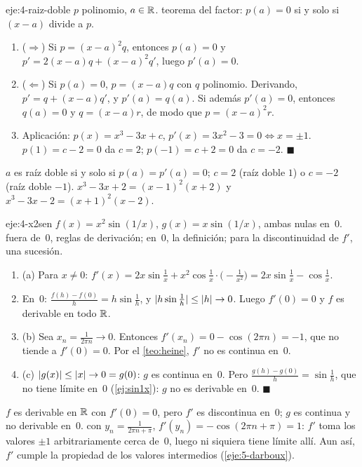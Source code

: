 \begin{solucion}{eje:4-raiz-doble}
\datos $p$ polinomio, $a\in\mathbb{R}$.
\planteamiento teorema del factor: $p(a)=0$ si y solo si $(x-a)$ divide a $p$.
\pasos
\begin{enumerate}[label=\arabic*.]
  \item ($\Rightarrow$) Si $p=(x-a)^{2}q$, entonces $p(a)=0$ y $p'=2(x-a)q+(x-a)^{2}q'$, luego $p'(a)=0$.
  \item ($\Leftarrow$) Si $p(a)=0$, $p=(x-a)q$ con $q$ polinomio. Derivando, $p'=q+(x-a)q'$, y $p'(a)=q(a)$. Si además $p'(a)=0$, entonces $q(a)=0$ y $q=(x-a)r$, de modo que $p=(x-a)^{2}r$.
  \item Aplicación: $p(x)=x^{3}-3x+c$, $p'(x)=3x^{2}-3=0\iff x=\pm1$. $p(1)=c-2=0$ da $c=2$; $p(-1)=c+2=0$ da $c=-2$. \hfill$\blacksquare$
\end{enumerate}
\resultado $a$ es raíz doble si y solo si $p(a)=p'(a)=0$; $c=2$ (raíz doble $1$) o $c=-2$ (raíz doble $-1$).
\comprobacion $x^{3}-3x+2=(x-1)^{2}(x+2)$ y $x^{3}-3x-2=(x+1)^{2}(x-2)$.
\end{solucion}

\begin{solucion}{eje:4-x2sen}
\datos $f(x)=x^{2}\sin(1/x)$, $g(x)=x\sin(1/x)$, ambas nulas en~0.
\planteamiento fuera de~0, reglas de derivación; en~0, la definición; para la discontinuidad de $f'$, una sucesión.
\pasos
\begin{enumerate}[label=\arabic*.]
  \item (a) Para $x\ne0$: $f'(x)=2x\sin\frac1x+x^{2}\cos\frac1x\cdot\bigl(-\frac{1}{x^{2}}\bigr)=2x\sin\frac1x-\cos\frac1x$.
  \item En~0: $\frac{f(h)-f(0)}{h}=h\sin\frac1h$, y $\lvert h\sin\frac1h\rvert\le\lvert h\rvert\to0$. Luego $f'(0)=0$ y $f$ es derivable en todo $\mathbb{R}$.
  \item (b) Sea $x_n=\frac{1}{2\pi n}\to0$. Entonces $f'(x_n)=0-\cos(2\pi n)=-1$, que no tiende a $f'(0)=0$. Por el \cref{teo:heine}, $f'$ no es continua en~0.
  \item (c) $\lvert g(x)\rvert\le\lvert x\rvert\to0=g(0)$: $g$ es continua en~0. Pero $\frac{g(h)-g(0)}{h}=\sin\frac1h$, que no tiene límite en~0 (\cref{ej:sin1x}): $g$ no es derivable en~0. \hfill$\blacksquare$
\end{enumerate}
\resultado $f$ es derivable en $\mathbb{R}$ con $f'(0)=0$, pero $f'$ es discontinua en~0; $g$ es continua y no derivable en~0.
\comprobacion con $y_n=\frac{1}{2\pi n+\pi}$, $f'(y_n)=-\cos(2\pi n+\pi)=1$: $f'$ toma los valores $\pm1$ arbitrariamente cerca de~0, luego ni siquiera tiene límite allí. Aun así, $f'$ cumple la propiedad de los valores intermedios (\cref{eje:5-darboux}).
\end{solucion}

